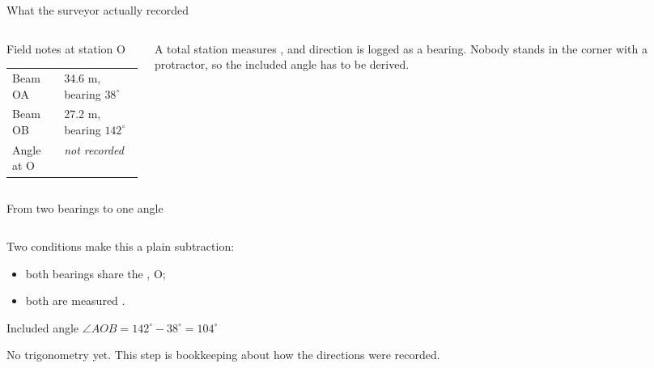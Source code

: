 \documentclass[11pt]{beamer}
\begin{document}
\begin{frame}{What the surveyor actually recorded}
  \begin{columns}[T,onlytextwidth]
    \begin{column}{0.48\textwidth}
      \begin{block}{Field notes at station O}
        \small
        \begin{tabular}{@{}ll@{}}
          Beam OA & 34.6 m, bearing $38^\circ$\\
          Beam OB & 27.2 m, bearing $142^\circ$\\[2pt]
          \midrule
          Angle at O & \emph{not recorded}\\
        \end{tabular}
      \end{block}
    \end{column}
    \hfill
    \begin{column}{0.44\textwidth}
      \small A total station measures , and
      direction is logged as a bearing. Nobody stands in the corner with a
      protractor, so \alert{the included angle has to be derived.}
    \end{column}
  \end{columns}
  \vfill
  \begin{center}
    \scalebox{0.70}{\diagBearingConvention}
  \end{center}
\end{frame}

\begin{frame}{From two bearings to one angle}
  \begin{columns}[T]
    \begin{column}{0.46\textwidth}
      \small
      Two conditions make this a plain subtraction:
      \begin{itemize}
        \item both bearings share the , O;
        \item both are measured .
      \end{itemize}
      \medskip

      \begin{alertblock}{Included angle}
        \centering $\angle AOB = 142^\circ - 38^\circ = 104^\circ$
      \end{alertblock}

      No trigonometry yet. This step is bookkeeping about how the directions
      were recorded.
    \end{column}
    \begin{column}{0.54\textwidth}
      \centering
      \scalebox{0.80}{\diagBearingSubtraction}
    \end{column}
  \end{columns}
\end{frame}
\end{document}
